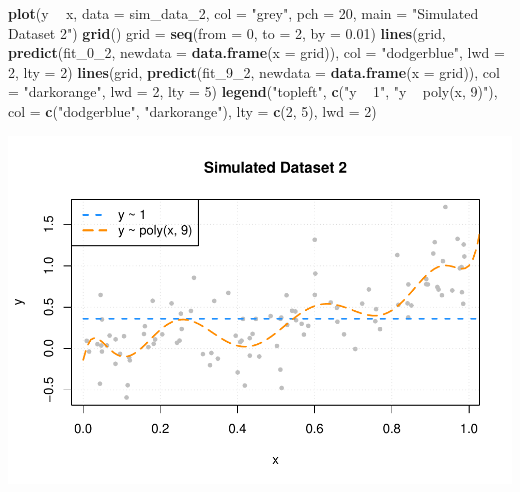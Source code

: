 \documentclass[]{report}
\newenvironment{Shaded}{\begin{snugshade}}{\end{snugshade}}
\newcommand{\KeywordTok}[1]{\textcolor[rgb]{0.13,0.29,0.53}{\textbf{#1}}}
\newcommand{\DataTypeTok}[1]{\textcolor[rgb]{0.13,0.29,0.53}{#1}}
\newcommand{\DecValTok}[1]{\textcolor[rgb]{0.00,0.00,0.81}{#1}}
\newcommand{\FloatTok}[1]{\textcolor[rgb]{0.00,0.00,0.81}{#1}}
\newcommand{\StringTok}[1]{\textcolor[rgb]{0.31,0.60,0.02}{#1}}
\newcommand{\OperatorTok}[1]{\textcolor[rgb]{0.81,0.36,0.00}{\textbf{#1}}}
\newcommand{\NormalTok}[1]{#1}
\begin{document}
\begin{Shaded}
\begin{Highlighting}[]
\KeywordTok{plot}\NormalTok{(y }\OperatorTok{~}\StringTok{ }\NormalTok{x, }\DataTypeTok{data =}\NormalTok{ sim_data_}\DecValTok{2}\NormalTok{, }\DataTypeTok{col =} \StringTok{"grey"}\NormalTok{, }\DataTypeTok{pch =} \DecValTok{20}\NormalTok{, }\DataTypeTok{main =} \StringTok{"Simulated Dataset 2"}\NormalTok{)}
\KeywordTok{grid}\NormalTok{()}
\NormalTok{grid =}\StringTok{ }\KeywordTok{seq}\NormalTok{(}\DataTypeTok{from =} \DecValTok{0}\NormalTok{, }\DataTypeTok{to =} \DecValTok{2}\NormalTok{, }\DataTypeTok{by =} \FloatTok{0.01}\NormalTok{)}
\KeywordTok{lines}\NormalTok{(grid, }\KeywordTok{predict}\NormalTok{(fit_0_}\DecValTok{2}\NormalTok{, }\DataTypeTok{newdata =} \KeywordTok{data.frame}\NormalTok{(}\DataTypeTok{x =}\NormalTok{ grid)), }\DataTypeTok{col =} \StringTok{"dodgerblue"}\NormalTok{, }\DataTypeTok{lwd =} \DecValTok{2}\NormalTok{, }\DataTypeTok{lty =} \DecValTok{2}\NormalTok{)}
\KeywordTok{lines}\NormalTok{(grid, }\KeywordTok{predict}\NormalTok{(fit_9_}\DecValTok{2}\NormalTok{, }\DataTypeTok{newdata =} \KeywordTok{data.frame}\NormalTok{(}\DataTypeTok{x =}\NormalTok{ grid)), }\DataTypeTok{col =} \StringTok{"darkorange"}\NormalTok{, }\DataTypeTok{lwd =} \DecValTok{2}\NormalTok{, }\DataTypeTok{lty =} \DecValTok{5}\NormalTok{)}
\KeywordTok{legend}\NormalTok{(}\StringTok{"topleft"}\NormalTok{, }\KeywordTok{c}\NormalTok{(}\StringTok{"y ~ 1"}\NormalTok{, }\StringTok{"y ~ poly(x, 9)"}\NormalTok{), }\DataTypeTok{col =} \KeywordTok{c}\NormalTok{(}\StringTok{"dodgerblue"}\NormalTok{, }\StringTok{"darkorange"}\NormalTok{), }\DataTypeTok{lty =} \KeywordTok{c}\NormalTok{(}\DecValTok{2}\NormalTok{, }\DecValTok{5}\NormalTok{), }\DataTypeTok{lwd =} \DecValTok{2}\NormalTok{)}
\end{Highlighting}
\end{Shaded}

\includegraphics{MyBook_files/figure-latex/unnamed-chunk-109-1.pdf}
\end{document}
